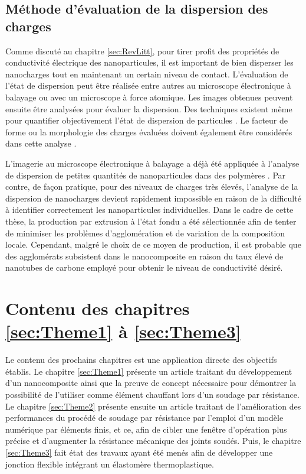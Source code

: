 \subsection{Méthode d'évaluation de la dispersion des charges}

Comme discuté au chapitre \ref{sec:RevLitt}, pour tirer profit des propriétés de conductivité électrique des nanoparticules, il est important de bien disperser les nanocharges tout en maintenant un certain niveau de contact. 
L'évaluation de l'état de dispersion peut être réalisée entre autres au microscope électronique à balayage ou avec un microscope à force atomique. 
Les images obtenues peuvent ensuite être analysées pour évaluer la dispersion. 
Des techniques existent même pour quantifier objectivement l'état de dispersion de particules \cite{Bray2011,Bray2012}. 
Le facteur de forme ou la morphologie des charges évaluées doivent également être considérés dans cette analyse \cite{Bray2013a,Sul2011}. 

L'imagerie au microscope électronique à balayage a déjà été appliquée à l'analyse de dispersion de petites quantités de nanoparticules dans des polymères \cite{Xie2005,Diez-Pascual2009,Xin2011,Grossiord2008a,Bauhofer2009,Abbas2016}. 
Par contre, de façon pratique, pour des niveaux de charges très élevés, l'analyse de la dispersion de nanocharges devient rapidement impossible en raison de la difficulté à identifier correctement les nanoparticules individuelles. 
Dans le cadre de cette thèse, la production par extrusion à l'état fondu a été sélectionnée afin de tenter de minimiser les problèmes d'agglomération et de variation de la composition locale. 
Cependant, malgré le choix de ce moyen de production, il est probable que des agglomérats subsistent dans le nanocomposite en raison du taux élevé de nanotubes de carbone employé pour obtenir le niveau de conductivité désiré. 

\section{Contenu des chapitres \ref{sec:Theme1} à \ref{sec:Theme3}}

Le contenu des prochains chapitres est une application directe des objectifs établis. 
Le chapitre \ref{sec:Theme1} présente un article traitant du développement d'un nanocomposite ainsi que la preuve de concept nécessaire pour démontrer la possibilité de l'utiliser comme élément chauffant lors d'un soudage par résistance. 
Le chapitre \ref{sec:Theme2} présente ensuite un article traitant de l'amélioration des performances du procédé de soudage par résistance par l'emploi d'un modèle numérique par éléments finis, et ce, afin de cibler une fenêtre d'opération plus précise et d'augmenter la résistance mécanique des joints soudés. 
Puis, le chapitre \ref{sec:Theme3} fait état des travaux ayant été menés afin de développer une jonction flexible intégrant un élastomère thermoplastique. 
